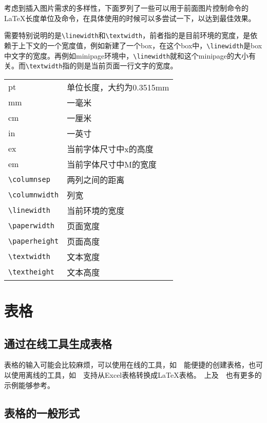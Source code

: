 考虑到插入图片需求的多样性，下面罗列了一些可以用于前面图片控制命令的\LaTeX 长度单位及命令，在具体使用的时候可以多尝试一下，以达到最佳效果。

需要特别说明的是\verb|\linewidth|和\verb|\textwidth|，前者指的是目前环境的宽度，是依赖于上下文的一个宽度值，例如新建了一个box，在这个box中，\verb|\linewidth|是box中文字的宽度。再例如minipage环境中，\verb|\linewidth|就和这个minipage的大小有关。而\verb|\textwidth|指的则是当前页面一行文字的宽度。

\begin{tabular}[!htb]{ll}
pt & 单位长度，大约为0.3515mm \\
mm & 一毫米 \\
cm & 一厘米 \\
in & 一英寸 \\
ex & 当前字体尺寸中x的高度 \\
em & 当前字体尺寸中M的宽度 \\
\verb|\columnsep| & 两列之间的距离 \\
\verb|\columnwidth| & 列宽 \\
\verb|\linewidth| & 当前环境的宽度 \\
\verb|\paperwidth| & 页面宽度 \\
\verb|\paperheight| & 页面高度 \\
\verb|\textwidth| & 文本宽度 \\
\verb|\textheight| & 文本高度 \\
\end{tabular}

\section{表格}

\subsection{通过在线工具生成表格}

表格的输入可能会比较麻烦，可以使用在线的工具，如~~能便捷的创建表格，也可以使用离线的工具，如~~支持从Excel表格转换成\LaTeX{}表格。~上及~~也有更多的示例能够参考。

\subsection{表格的一般形式}

